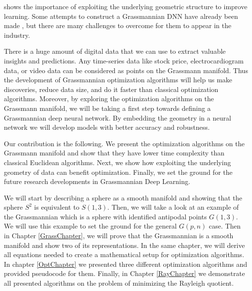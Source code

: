 \documentclass[11pt,a4paper]{report}
\begin{document}
shows the importance of exploiting the underlying geometric structure to improve learning.
Some attempts to construct a Grassmannian DNN have already been made \cite{zhang_grassmannian_2018} \cite{huang_building_2018}, but there are many challenges to overcome for them to appear in the industry.
\par
There is a huge amount of digital data that we can use to extract valuable insights and predictions.
Any time-series data like stock price, electrocardiogram data, or video data can be considered as points on the Grassmann manifold.
Thus the development of Grassmannian optimization algorithms will help us make discoveries, reduce data size, and do it faster than classical optimization algorithms.
Moreover, by exploring the optimization algorithms on the Grassmann manifold, we will be taking a first step towards defining a Grassmannian deep neural network.
By embedding the geometry in a neural network we will develop models with better accuracy and robustness.
\par
Our contribution is the following.
We present the optimization algorithms on the Grassmann manifold and show that they have lower time complexity than classical Euclidean algorithms.
Next, we show how exploiting the underlying geometry of data can benefit optimization.
Finally, we set the ground for the future research developments in Grassmannian Deep Learning.
\par
We will start by describing a sphere as a smooth manifold and showing that the sphere $S^2$ is equivalent to $S(1,3)$.
Then, we will take a look at an example of the Grassmannian which is a sphere with identified antipodal points $G(1,3)$.
We will use this example to set the ground for the general $G(p,n)$ case. Then in Chapter \ref{GrassChapter}, we will prove that the Grassmannian is a smooth manifold and show two of its representations.
In the same chapter, we will derive all equations needed to create a mathematical setup for optimization algorithms.
In chapter \ref{OptChapter} we presented three different optimization algorithms and provided pseudocode for them.
Finally, in Chapter \ref{RayChapter} we demonstrate all presented algorithms on the problem of minimizing the Rayleigh quotient.
\end{document}
